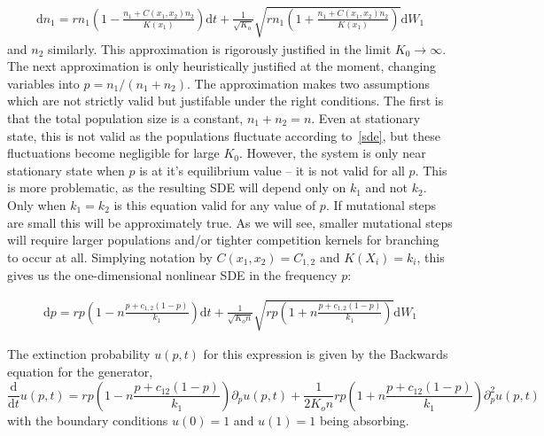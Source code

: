 \documentclass[letterpaper,10pt]{article}
\newcommand{\ud}{\mathrm{d}}
\begin{document}
\begin{align}
\ud n_1 = r n_1 \left(1 -  \frac{n_1 + C(x_1, x_2) n_2}{K(x_1) } \right) \ud t + \frac{1}{\sqrt{K_o} } \sqrt{r n_1 \left(1 +  \frac{n_1 + C(x_1, x_2) n_2}{K(x_1) } \right) } \ud W_1
\label{sde}
\end{align}
and $n_2$ similarly.  This approximation is rigorously justified in the limit $K_0 \to \infty$.  The next approximation is only heuristically justified at the moment, changing variables into $p = n_1/(n_1+n_2)$.  The approximation makes two assumptions which are not strictly valid but justifable under the right conditions.  The first is that the total population size is a constant, $n_1 + n_2 = n$.  Even at stationary state, this is not valid as the populations fluctuate according to~\eqref{sde}, but these fluctuations become negligible for large $K_0$.  However, the system is only near stationary state when $p$ is at it's equilibrium value -- it is not valid for all $p$.  This is more problematic, as the resulting SDE will depend only on $k_1$ and not $k_2$.  Only when $k_1 = k_2$ is this equation valid for any value of $p$.  If mutational steps are small this will be approximately true.  As we will see, smaller mutational steps will require larger populations and/or tighter competition kernels for branching to occur at all.  Simplying notation by $C(x_1, x_2) = C_{1,2}$ and $K(X_i) = k_i$, this gives us the one-dimensional nonlinear SDE in the frequency $p$:

\begin{align}
\ud p = r p \left(1 -  n \frac{p + c_{1,2}(1-p) }{k_1 } \right) \ud t + \frac{1}{\sqrt{K_o n} } \sqrt{r p \left(1 +  n\frac{p + c_{1,2} (1-p) }{k_1 } \right) } \ud W_1
\end{align}

The extinction probability $u(p,t)$ for this expression is given by the Backwards equation for the generator,
\begin{equation}
\frac{\ud}{\ud t} u(p,t) = r p \left(1 -  n \frac{p + c_{12}(1-p) }{k_1 } \right) \partial_p u(p,t) + \frac{1}{2K_o n } r p \left(1 +  n\frac{p + c_{12} (1-p) }{k_1 } \right) \partial_p^2 u(p,t) 
\label{u}
\end{equation}
with the boundary conditions $u(0) = 1$ and $u(1) = 1$ being absorbing.  
\end{document}
